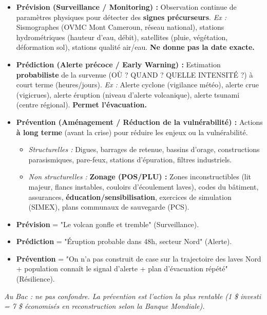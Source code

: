 \documentclass[11pt]{article}
\begin{document}
\begin{definition}
\begin{itemize}
    \item \textbf{Prévision (Surveillance / Monitoring) :} Observation continue de paramètres physiques pour détecter des \textbf{signes précurseurs}. \emph{Ex :} Sismographes (OVMC Mont Cameroun, réseau national), stations hydrométriques (hauteur d'eau, débit), satellites (pluie, végétation, déformation sol), stations qualité air/eau. \textbf{Ne donne pas la date exacte.}
    \item \textbf{Prédiction (Alerte précoce / Early Warning) :} Estimation \textbf{probabiliste} de la survenue (OÙ ? QUAND ? QUELLE INTENSITÉ ?) à court terme (heures/jours). \emph{Ex :} Alerte cyclone (vigilance météo), alerte crue (vigicrues), alerte éruption (niveau d'alerte volcanique), alerte tsunami (centre régional). \textbf{Permet l'évacuation.}
    \item \textbf{Prévention (Aménagement / Réduction de la vulnérabilité) :} Actions \textbf{à long terme} (avant la crise) pour réduire les enjeux ou la vulnérabilité.
    \begin{itemize}
        \item \emph{Structurelles :} Digues, barrages de retenue, bassins d'orage, constructions parasismiques, pare-feux, stations d'épuration, filtres industriels.
        \item \emph{Non structurelles :} \textbf{Zonage (POS/PLU) :} Zones inconstructibles (lit majeur, flancs instables, couloirs d'écoulement laves), codes du bâtiment, assurances, \textbf{éducation/sensibilisation}, exercices de simulation (SIMEX), plans communaux de sauvegarde (PCS).
    \end{itemize}
\end{itemize}
\end{definition}

\begin{attention}
\begin{itemize}
    \item \textbf{Prévision} = "Le volcan gonfle et tremble" (Surveillance).
    \item \textbf{Prédiction} = "Éruption probable dans 48h, secteur Nord" (Alerte).
    \item \textbf{Prévention} = "On n'a pas construit de case sur la trajectoire des laves Nord + population connaît le signal d'alerte + plan d'évacuation répété" (Résilience).
\end{itemize}
\emph{Au Bac : ne pas confondre. La prévention est l'action la plus rentable (1 \$ investi = 7 \$ économisés en reconstruction selon la Banque Mondiale).}
\end{attention}
\end{document}
